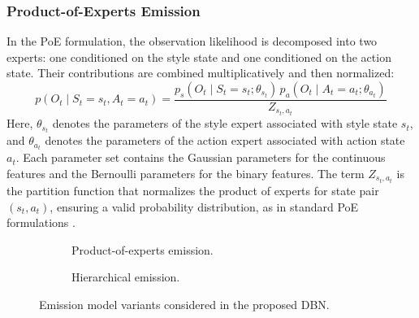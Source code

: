 \subsubsection{Product-of-Experts Emission}
\label{subsubsec:poe_emission}
In the \ac{PoE} formulation, the observation likelihood is decomposed into two experts: one conditioned on the style state and one conditioned on the action state. 
Their contributions are combined multiplicatively and then normalized:
\begin{equation}
p(O_t \mid S_t=s_t, A_t=a_t) = \frac{p_s(O_t \mid S_t=s_t; \theta_{s_t})\,p_a(O_t \mid A_t=a_t; \theta_{a_t})}{Z_{s_t,a_t}}
\end{equation}
Here, $\theta_{s_t}$ denotes the parameters of the style expert associated with style state $s_t$, and $\theta_{a_t}$ denotes the parameters of the action expert associated with action state $a_t$. 
Each parameter set contains the Gaussian parameters for the continuous features and the Bernoulli parameters for the binary features. 
The term $Z_{s_t,a_t}$ is the partition function that normalizes the product of experts for state pair $(s_t,a_t)$, 
ensuring a valid probability distribution, as in standard \ac{PoE} formulations \cite{Hinton2002}.

\begin{figure}[htbp]
    \centering
    \begin{subfigure}[t]{0.48\textwidth}
        \centering
        \begin{minipage}[t][8.25cm][c]{\linewidth}
            \centering
            
        \end{minipage}
        \caption{Product-of-experts emission.}
        \label{fig:poe_emission}
    \end{subfigure}
    \hfill
    \begin{subfigure}[t]{0.48\textwidth}
        \centering
        \begin{minipage}[t][8.25cm][c]{\linewidth}
            \centering
            
        \end{minipage}
        \caption{Hierarchical emission.}
        \label{fig:hierarchical_emission}
    \end{subfigure}
    \caption{Emission model variants considered in the proposed DBN.}
    \label{fig:emission_variants}
\end{figure}

